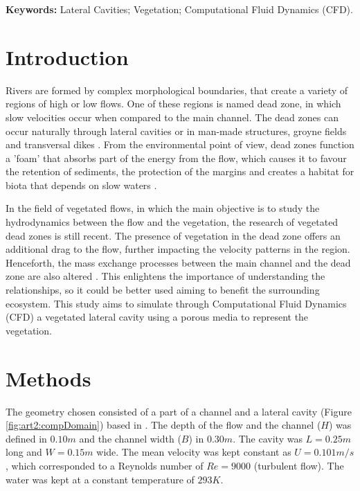 \noindent\textbf{Keywords:} Lateral Cavities; Vegetation; Computational Fluid Dynamics (CFD).

\section{Introduction}
Rivers are formed by complex morphological boundaries, that create a variety of regions of high or low flows. One of these regions is named dead zone, in which slow velocities occur when compared to the main channel. The dead zones can occur naturally through lateral cavities \cite{jackson2013} or in man-made structures, groyne fields \cite{sukhodolov2017} and transversal dikes \cite{Pandey2018}. From the environmental point of view, dead zones function a 'foam' that absorbs part of the energy from the flow, which causes it to favour the retention of sediments, the protection of the margins and creates a habitat for biota that depends on slow waters \cite{Weitbrecht2008}.

In the field of vegetated flows, in which the main objective is to study the hydrodynamics between the flow and the vegetation, the research of vegetated dead zones is still recent. The presence of vegetation in the dead zone offers an additional drag to the flow, further impacting the velocity patterns in the region. Henceforth, the mass exchange processes between the main channel and the dead zone are also altered \cite{xiang2019}. This enlightens the importance of understanding the relationships, so it could be better used aiming to benefit the surrounding ecosystem. This study aims to simulate through Computational Fluid Dynamics (CFD) a vegetated lateral cavity using a porous media to represent the vegetation.

\section{Methods}
The geometry chosen consisted of a part of a channel and a lateral cavity (Figure \ref{fig:art2:compDomain}) based in \cite{xiang2019}. The depth of the flow and the channel ($H$) was defined in $0.10 m$ and the channel width ($B$) in $0.30m$. The cavity was $L=0.25 m$ long and $W=0.15m$ wide. The mean velocity was kept constant as $U=0.101m/s$, which corresponded to a Reynolds number of $Re=9000$ (turbulent flow). The water was kept at a constant temperature of $293K$.


